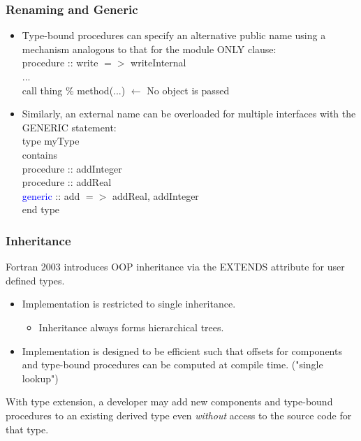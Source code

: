 \documentclass[11pt]{beamer}
\begin{document}
\begin{frame}[fragile]
\frametitle{Renaming and Generic}

\begin{itemize}
\item Type-bound procedures can specify an alternative public name using a mechanism analogous to that for the module ONLY clause:\\
  \quad procedure :: write $=>$ writeInternal\\
  \quad ...\\
  \quad call thing \% method(...)  $\leftarrow$ No object is passed \\
  
  \item Similarly, an external name can be overloaded for multiple interfaces with the GENERIC statement:\\
  \quad type myType\\
  \quad contains\\
  \quad \quad procedure :: addInteger\\
  \quad \quad procedure :: addReal\\
  \quad \quad \textcolor{blue}{generic} :: add $=> $ addReal, addInteger\\
  \quad end type\\
\end{itemize}

\end{frame}



\begin{frame}[fragile]
\frametitle{Inheritance}
Fortran 2003 introduces OOP inheritance via the EXTENDS attribute for user defined types.
\begin{itemize}
\item Implementation is restricted to single inheritance.
  \begin{itemize}
  \item Inheritance always forms hierarchical trees.
  \end{itemize}

\item Implementation is designed to be efficient such that offsets for components and type-bound procedures can be computed at compile time. ("single lookup")

\end{itemize}
With type extension, a developer may add new components and type-bound procedures to an existing derived type even \emph{without} access to the source code for that type.
\end{frame}
\end{document}
